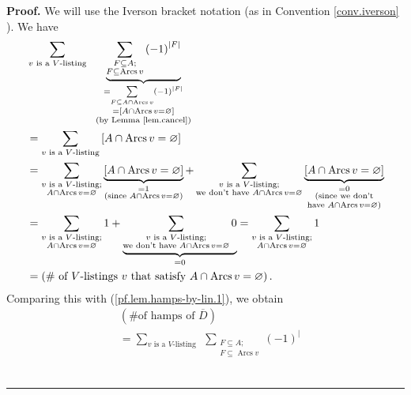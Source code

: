 \documentclass[numbers=enddot,12pt,final,onecolumn,notitlepage]{scrartcl}%
\numberwithin{exer}{section}
\theoremstyle{definition}
\newenvironment{proof}[1][Proof]{\noindent\textbf{#1.} }{\ \rule{0.5em}{0.5em}}
\let\sumnonlimits\sum
\renewcommand{\sum}{\sumnonlimits\limits}
\newenvironment{verlong}{}{}
\begin{document}
\begin{verlong}
\begin{proof}
We will use the Iverson bracket notation (as in Convention \ref{conv.iverson}%
). We have%
\begin{align*}
&  \sum_{v\text{ is a }V\text{-listing}}\ \ \underbrace{\sum
_{\substack{F\subseteq A;\\F\subseteq\operatorname*{Arcs}v}}\left(  -1\right)
^{\left\vert F\right\vert }}_{\substack{=\sum_{F\subseteq A\cap
\operatorname*{Arcs}v}\left(  -1\right)  ^{\left\vert F\right\vert }\\=\left[
A\cap\operatorname*{Arcs}v=\varnothing\right]  \\\text{(by Lemma
\ref{lem.cancel})}}}\\
&  =\sum_{v\text{ is a }V\text{-listing}}\left[  A\cap\operatorname*{Arcs}%
v=\varnothing\right] \\
&  =\sum_{\substack{v\text{ is a }V\text{-listing;}\\A\cap\operatorname*{Arcs}%
v=\varnothing}}\underbrace{\left[  A\cap\operatorname*{Arcs}v=\varnothing
\right]  }_{\substack{=1\\\text{(since }A\cap\operatorname*{Arcs}%
v=\varnothing\text{)}}}+\sum_{\substack{v\text{ is a }V\text{-listing;}%
\\\text{we don't have }A\cap\operatorname*{Arcs}v=\varnothing}%
}\underbrace{\left[  A\cap\operatorname*{Arcs}v=\varnothing\right]
}_{\substack{=0\\\text{(since we don't}\\\text{have }A\cap\operatorname*{Arcs}%
v=\varnothing\text{)}}}\\
&  =\sum_{\substack{v\text{ is a }V\text{-listing;}\\A\cap\operatorname*{Arcs}%
v=\varnothing}}1+\underbrace{\sum_{\substack{v\text{ is a }V\text{-listing;}%
\\\text{we don't have }A\cap\operatorname*{Arcs}v=\varnothing}}0}_{=0}%
=\sum_{\substack{v\text{ is a }V\text{-listing;}\\A\cap\operatorname*{Arcs}%
v=\varnothing}}1\\
&  =\left(  \text{\# of }V\text{-listings }v\text{ that satisfy }%
A\cap\operatorname*{Arcs}v=\varnothing\right)  .
\end{align*}
Comparing this with (\ref{pf.lem.hamps-by-lin.1}), we obtain%
\begin{align}
&  \left(  \text{\# of hamps of }\overline{D}\right) \nonumber\\
&  =\sum_{v\text{ is a }V\text{-listing}}\ \ \sum_{\substack{F\subseteq
A;\\F\subseteq\operatorname*{Arcs}v}}\left(  -1\right)  ^{\left\vert
}
\end{align}
\end{proof}
\end{verlong}
\end{document}
